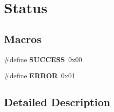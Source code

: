 \hypertarget{group___status}{\section{Status}
\label{group___status}
}
\subsection*{Macros}
\begin{DoxyCompactItemize}
\item 
\hypertarget{group___status_gaa90cac659d18e8ef6294c7ae337f6b58}{\#define {\bfseries S\-U\-C\-C\-E\-S\-S}~0x00}\label{group___status_gaa90cac659d18e8ef6294c7ae337f6b58}

\item 
\hypertarget{group___status_ga8fe83ac76edc595f6b98cd4a4127aed5}{\#define {\bfseries E\-R\-R\-O\-R}~0x01}\label{group___status_ga8fe83ac76edc595f6b98cd4a4127aed5}

\end{DoxyCompactItemize}


\subsection{Detailed Description}
